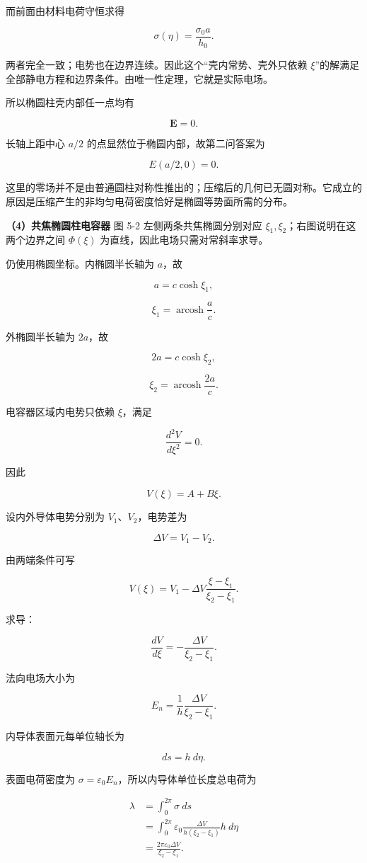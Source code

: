 \documentclass[12pt,a4paper,UTF8]{ctexart}
\begin{document}
而前面由材料电荷守恒求得

\[\sigma(\eta)=\frac{\sigma_0a}{h_0}.\]

两者完全一致；电势也在边界连续。因此这个``壳内常势、壳外只依赖
\(\xi\)''的解满足全部静电方程和边界条件。由唯一性定理，它就是实际电场。

所以椭圆柱壳内部任一点均有

\[\boxed{\bm E=0}.\]

长轴上距中心 \(a/2\) 的点显然位于椭圆内部，故第二问答案为

\[\boxed{E(a/2,0)=0}.\]

这里的零场并不是由普通圆柱对称性推出的；压缩后的几何已无圆对称。它成立的原因是压缩产生的非均匀电荷密度恰好是椭圆等势面所需的分布。

\textbf{（4）共焦椭圆柱电容器} 图 5-2 左侧两条共焦椭圆分别对应
\(\xi_1,\xi_2\)；右图说明在这两个边界之间 \(\Phi(\xi)\)
为直线，因此电场只需对常斜率求导。

仍使用椭圆坐标。内椭圆半长轴为 \(a\)，故

\[a=c\cosh\xi_1,\]

\[\boxed{\xi_1=\operatorname{arcosh}\frac ac}.\]

外椭圆半长轴为 \(2a\)，故

\[2a=c\cosh\xi_2,\]

\[\boxed{\xi_2=\operatorname{arcosh}\frac{2a}{c}}.\]

电容器区域内电势只依赖 \(\xi\)，满足

\[\frac{d^2V}{d\xi^2}=0.\]

因此

\[V(\xi)=A+B\xi.\]

设内外导体电势分别为 \(V_1\)、\(V_2\)，电势差为

\[\Delta V=V_1-V_2.\]

由两端条件可写

\[V(\xi)=V_1-\Delta V\frac{\xi-\xi_1}{\xi_2-\xi_1}.\]

求导：

\[\frac{dV}{d\xi}=-\frac{\Delta V}{\xi_2-\xi_1}.\]

法向电场大小为

\[E_n=\frac1h\frac{\Delta V}{\xi_2-\xi_1}.\]

内导体表面元每单位轴长为

\[ds=h\ d\eta.\]

表面电荷密度为 \(\sigma=\varepsilon_0E_n\)，所以内导体单位长度总电荷为

\[\begin{aligned}
\lambda
&=\int_0^{2\pi}\sigma\ ds\\
&=\int_0^{2\pi}
\varepsilon_0\frac{\Delta V}{h(\xi_2-\xi_1)}h\ d\eta\\
&=\frac{2\pi\varepsilon_0\Delta V}{\xi_2-\xi_1}.
\end{aligned}\]
\end{document}
